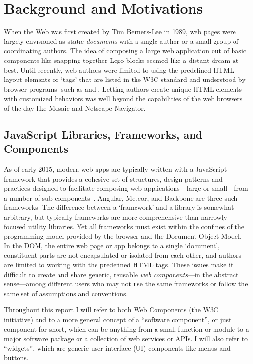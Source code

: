 \chapter{Background and Motivations}
%
\label{ch:background}

When the Web was first created by Tim Berners-Lee in 1989, web pages were largely envisioned as static \textit{documents} with a single author or a small group of coordinating authors. 
The idea of composing a large web application out of basic components like snapping together Lego blocks seemed like a distant dream at best.
Until recently, web authors were limited to using the predefined HTML layout elements or `tags' that are listed in the W3C standard and understood by browser programs, such as  and . 
Letting authors create unique HTML elements with customized behaviors was well beyond the capabilities of the web browsers of the day like Mosaic
and Netscape Navigator.

\section{JavaScript Libraries, Frameworks, and Components}
As of early 2015, modern web apps are typically written with a JavaScript framework that provides a cohesive set of structures, design patterns and practices designed to facilitate composing web applications---large or small---from a number of sub-com\-ponents~\cite{dickey2014}.
Angular, Meteor, and Backbone are three such frameworks.
The difference between a `framework' and a library is somewhat arbitrary, but typically frameworks are more comprehensive than narrowly focused utility libraries.
Yet all frameworks must exist within the confines of the programming model provided by the browser and the Document Object Model. 
In the DOM, the entire web page or app belongs to a single `document', constituent parts are not encapsulated or isolated from each other, and authors are limited to working with the predefined HTML tags.
These issues make it difficult to create and share generic, reusable \textit{web components}---in the abstract sense---among different users who may not use the same frameworks or follow the same set of assumptions and conventions.

Throughout this report I will refer to both Web Components (the W3C initiative) and to a more general concept of a ``software component'', 
or just component for short, 
which can be anything from a small function or module to a major software package or a collection of web services or APIs.
I will also refer to ``widgets'', which are generic user interface (UI) components like menus and buttons.

